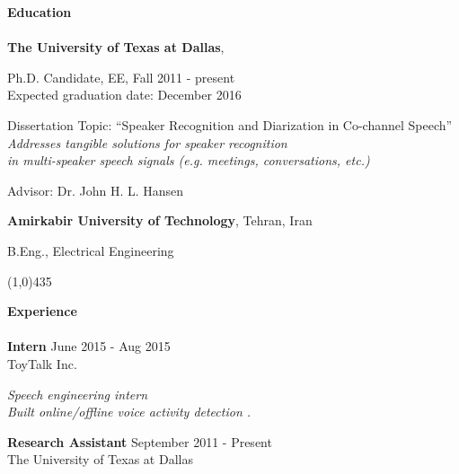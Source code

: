	\textbf{\sc Education\\\\}
	{\bf The University of Texas at Dallas}, \\
	\vspace*{-.1in}
	\begin{list1}
		\item[] Ph.D. Candidate, EE, Fall 2011 - present \\
		Expected graduation date: December 2016
		\begin{list2}
			\vspace*{0.in}
			\item[-]Dissertation Topic:  ``Speaker Recognition and Diarization in Co-channel Speech'' \\
			{\it Addresses tangible solutions for speaker recognition \\in multi-speaker speech signals (e.g. meetings, conversations, etc.) }
			\item[-]Advisor:  Dr. John H. L. Hansen
		\end{list2}
	\end{list1}
	\vspace{3mm}
	{\bf Amirkabir University of Technology}, Tehran, Iran\\
	\vspace*{-.1in}
	\begin{list1}
		\item[] B.Eng., Electrical Engineering
	\end{list1}
	\vspace{0mm}
	\line(1,0){435}
	
	
	\textbf{\sc Experience\\\\}
	{\bf Intern} \hfill {June 2015 - Aug 2015}\\
	  ToyTalk Inc.
	\begin{list1}
		\item[] {\it Speech engineering intern \\Built online/offline voice activity detection
			.}
		\vspace{2mm}
	\end{list1}
	
	
	
	{\bf Research Assistant} \hfill {September 2011 - Present}\\
	The University of Texas at Dallas
	

